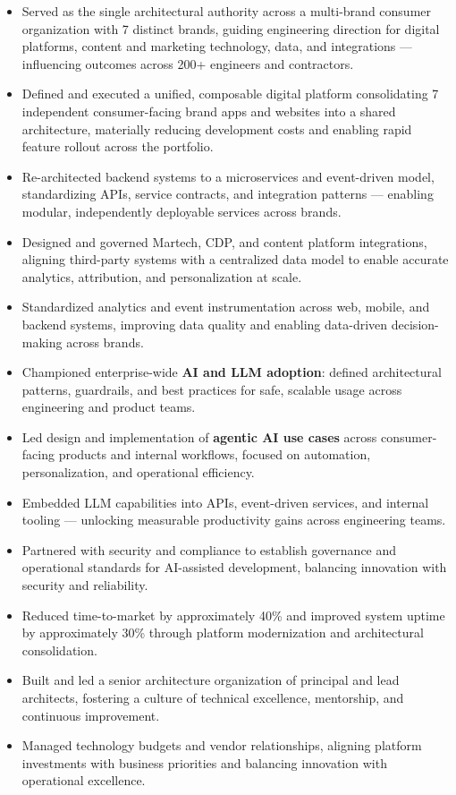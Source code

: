 \documentclass[11pt]{article}
\begin{document}
\begin{itemize}
  \item Served as the single architectural authority across a multi-brand consumer organization with 7 distinct brands, guiding engineering direction for digital platforms, content and marketing technology, data, and integrations --- influencing outcomes across 200+ engineers and contractors.
  \item Defined and executed a unified, composable digital platform consolidating 7 independent consumer-facing brand apps and websites into a shared architecture, materially reducing development costs and enabling rapid feature rollout across the portfolio.
  \item Re-architected backend systems to a microservices and event-driven model, standardizing APIs, service contracts, and integration patterns --- enabling modular, independently deployable services across brands.
  \item Designed and governed Martech, CDP, and content platform integrations, aligning third-party systems with a centralized data model to enable accurate analytics, attribution, and personalization at scale.
  \item Standardized analytics and event instrumentation across web, mobile, and backend systems, improving data quality and enabling data-driven decision-making across brands.
  \item Championed enterprise-wide \textbf{AI and LLM adoption}: defined architectural patterns, guardrails, and best practices for safe, scalable usage across engineering and product teams.
  \item Led design and implementation of \textbf{agentic AI use cases} across consumer-facing products and internal workflows, focused on automation, personalization, and operational efficiency.
  \item Embedded LLM capabilities into APIs, event-driven services, and internal tooling --- unlocking measurable productivity gains across engineering teams.
  \item Partnered with security and compliance to establish governance and operational standards for AI-assisted development, balancing innovation with security and reliability.
  \item Reduced time-to-market by approximately 40\% and improved system uptime by approximately 30\% through platform modernization and architectural consolidation.
  \item Built and led a senior architecture organization of principal and lead architects, fostering a culture of technical excellence, mentorship, and continuous improvement.
  \item Managed technology budgets and vendor relationships, aligning platform investments with business priorities and balancing innovation with operational excellence.
\end{itemize}
\end{document}
